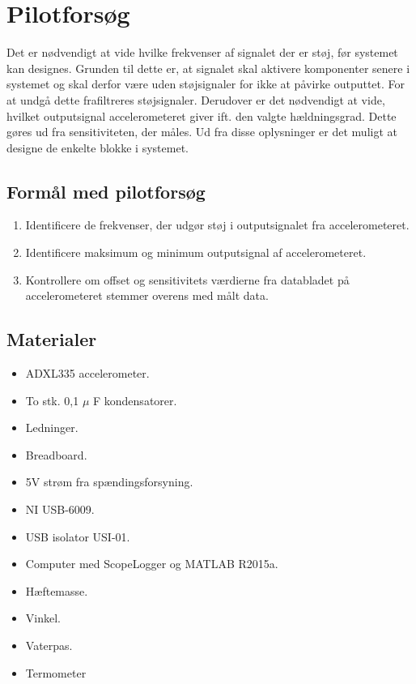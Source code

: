 \section{Pilotforsøg}
Det er nødvendigt at vide hvilke frekvenser af signalet der er støj, før systemet kan designes. Grunden til dette er, at signalet skal aktivere komponenter senere i systemet og skal derfor være uden støjsignaler for ikke at påvirke outputtet. For at undgå dette frafiltreres støjsignaler. Derudover er det nødvendigt at vide, hvilket outputsignal accelerometeret giver ift. den valgte hældningsgrad. Dette gøres ud fra sensitiviteten, der måles. Ud fra disse oplysninger er det muligt at designe de enkelte blokke i systemet.%

\subsection{Formål med pilotforsøg}
\begin{enumerate}
\item Identificere de frekvenser, der udgør støj i outputsignalet fra accelerometeret.
\item Identificere maksimum og minimum outputsignal af accelerometeret.
\item Kontrollere om offset og sensitivitets værdierne fra databladet på accelerometeret stemmer overens med målt data.
\end{enumerate}

\subsection{Materialer}
\begin{itemize}
\item ADXL335 accelerometer.
\item To stk. 0,1 $\mu$ F kondensatorer.
\item Ledninger.
\item Breadboard.
\item 5V strøm fra spændingsforsyning.
\item NI USB-6009.
\item USB isolator USI-01.
\item Computer med ScopeLogger og MATLAB R2015a.
\item Hæftemasse.
\item Vinkel.
\item Vaterpas.
\item Termometer
\end{itemize}

